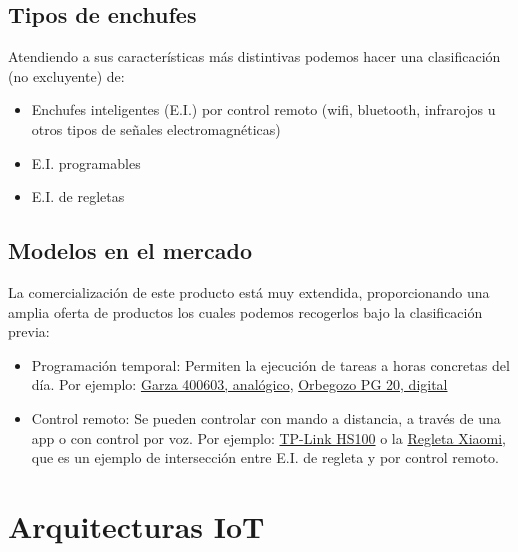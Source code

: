 \documentclass[a4paper,10pt]{article}
\begin{document}
\subsection{Tipos de enchufes}\label{tipos-de-enchufes}

Atendiendo a sus características más distintivas podemos hacer una
clasificación (no excluyente) de:

\begin{itemize}
\item
  Enchufes inteligentes (E.I.) por control remoto (wifi, bluetooth,
  infrarojos u otros tipos de señales electromagnéticas)
\item
  E.I. programables
\item
  E.I. de regletas
\end{itemize}

\subsection{Modelos en el mercado}\label{modelos-en-el-mercado}

La comercialización de este producto está muy extendida, proporcionando
una amplia oferta de productos los cuales podemos recogerlos bajo la
clasificación previa:

\begin{itemize}
\item
  Programación temporal: Permiten la ejecución de tareas a horas
  concretas del día. Por ejemplo:
  \href{https://web.archive.org/web/20191111121153/https://www.amazon.es/Garza-Power-Temporizador-anal\%C3\%B3gico-programaci\%C3\%B3n/dp/B00URUVDW2/}{Garza
  400603, analógico},
  \href{https://web.archive.org/web/20191112121450/https://www.amazon.es/dp/B00ZJ1LQDK}{Orbegozo
  PG 20, digital}
\item
  Control remoto: Se pueden controlar con mando a distancia, a través de
  una app o con control por voz. Por ejemplo:
  \href{https://web.archive.org/web/20191112130933/https://www.amazon.es/dp/B06W586CDZ}{TP-Link
  HS100} o la
  \href{https://web.archive.org/web/20191116174434/https://www.amazon.es/dp/B07DJ2G1CW}{Regleta
  Xiaomi}, que es un ejemplo de intersección entre E.I. de regleta y por
  control remoto.
\end{itemize}

\section{Arquitecturas IoT}\label{arquitecturas-iot}
\end{document}
